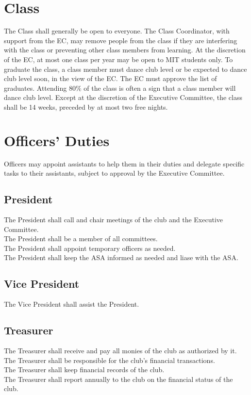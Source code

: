 \documentclass{article}
\begin{document}
\section{Class}
The Class shall generally be open to everyone. The Class Coordinator, with support from the EC, may remove people from the class if they are interfering with the class or preventing other class members from learning.  At the discretion of the EC, at most one class per year may be open to MIT students only. To graduate the class, a class member must dance club level or be expected to dance club level soon, in the view of the EC. The EC must approve the list of graduates. Attending 80\% of the class is often a sign that a class member will dance club level. 
Except at the discretion of the Executive Committee, the class shall be 14 weeks, preceded by at most two free nights.
\section {Officers' Duties}
Officers may appoint assistants to help them in their duties and delegate specific tasks to their assistants, subject to approval by the Executive Committee. 
\subsection {President}
The President shall call and chair meetings of the club and the Executive Committee. \\
The President shall be a member of all committees.\\
The President shall appoint temporary officers as needed.\\
The President shall keep the ASA informed as needed and liase with the ASA. 
\subsection{Vice President}
The Vice President shall assist the President. \\
\subsection{Treasurer}
The Treasurer shall receive and pay all monies of the club as authorized by it.\\ 
The Treasurer shall be responsible for the club's financial transactions. \\
The Treasurer shall keep financial records of the club. \\
The Treasurer shall report annually to the club on the financial status of the club. \\
\end{document}
